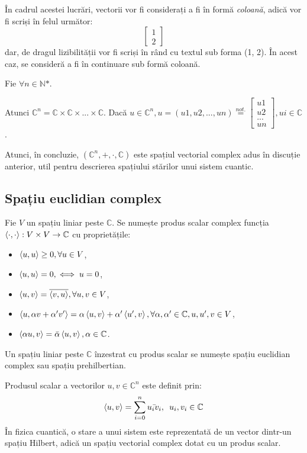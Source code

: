 În cadrul acestei lucrări, vectorii vor fi considerați a fi în formă \textit{coloană}, adică vor fi scriși în felul următor:
\[
\begin{bmatrix}
1 \\ 2
\end{bmatrix}
\]
dar, de dragul lizibilității vor fi scriși în rând cu textul sub forma (1, 2). În acest caz, se consideră a fi în continuare sub formă coloană.

Fie $\forall n \in \mathbb{N}\text{*}$.

Atunci $\mathbb{C}^n = \mathbb{C} \times \mathbb{C} \times ... \times \mathbb{C}$. Dacă $u \in \mathbb{C}^n, u=(u1, u2, ..., un) \overset{not.}{=} \begin{bmatrix}
u1 \\ u2 \\ ... \\ un
\end{bmatrix}, ui \in \mathbb{C}$.

Atunci, în concluzie, $(\mathbb{C}^n, +, \cdot, \mathbb{C})$ este spațiul vectorial complex adus în discuție anterior, util pentru descrierea spațiului stărilor unui sistem cuantic.

\subsection{Spațiu euclidian complex}

Fie $V$ un spațiu liniar peste $\mathbb{C}$. Se numește produs scalar complex funcția $\braket{\cdot, \cdot}: V \times V \rightarrow \mathbb{C}$ cu proprietățile:
\begin{itemize}
    \item $\braket{u,u} \geq 0, \forall u \in V$,
    \item $\braket{u,u} = 0, \iff u = 0$,
    \item $\braket{u,v} = \overline{\braket{v, u}}, \forall u, v \in V$,
    \item $\braket{u, \alpha v + \alpha ' v '} = \alpha \braket{u, v} + \alpha ' \braket{u ', v}, \forall \alpha, \alpha ' \in \mathbb{C}, u, u ' , v \in V$,
    \item $\braket{\alpha u, v} = \bar{\alpha} \braket{u, v}, \alpha \in \mathbb{C}$.
\end{itemize}

Un spațiu liniar peste $\mathbb{C}$ înzestrat cu produs scalar se numește spațiu euclidian complex sau spațiu prehilbertian.

Produsul scalar a vectorilor $u, v \in \mathbb{C}^n$ este definit prin:
\[
    \braket{u,v} = \sum_{i=0}^{n} \bar{u_i v_i}, \enspace u_i, v_i \in \mathbb{C}
\]
În fizica cuantică, o stare a unui sistem este reprezentată de un vector dintr-un spațiu Hilbert, adică un spațiu vectorial complex dotat cu un produs scalar.

